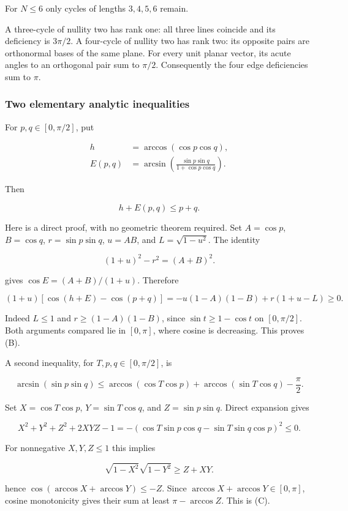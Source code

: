 \documentclass[11pt,a4paper]{article}
\begin{document}
For \(N\le6\) only cycles of lengths \(3,4,5,6\) remain.

A three-cycle of nullity two has rank one: all three lines coincide and its deficiency is \(3\pi/2\). A four-cycle of nullity two has rank two: its opposite pairs are orthonormal bases of the same plane. For every unit planar vector, its acute angles to an orthogonal pair sum to \(\pi/2\). Consequently the four edge deficiencies sum to \(\pi\).

\subsubsection{Two elementary analytic inequalities}\label{two-elementary-analytic-inequalities}

For \(p,q\in[0,\pi/2]\), put

\[
\begin{aligned}h&=\arccos(\cos p\cos q),\\E(p,q)&=\arcsin\!\left(\frac{\sin p\sin q}{1+\cos p\cos q}\right).\end{aligned}
\]

Then

\[
h+E(p,q)\le p+q.\tag{B}
\]

Here is a direct proof, with no geometric theorem required. Set \(A=\cos p\), \(B=\cos q\), \(r=\sin p\sin q\), \(u=AB\), and \(L=\sqrt{1-u^2}\). The identity

\[
(1+u)^2-r^2=(A+B)^2.
\]

gives \(\cos E=(A+B)/(1+u)\). Therefore

\[
(1+u)[\cos(h+E)-\cos(p+q)]=-u(1-A)(1-B)+r(1+u-L)\ge0.
\]

Indeed \(L\le1\) and \(r\ge(1-A)(1-B)\), since \(\sin t\ge1-\cos t\) on \([0,\pi/2]\). Both arguments compared lie in \([0,\pi]\), where cosine is decreasing. This proves (B).

A second inequality, for \(T,p,q\in[0,\pi/2]\), is

\[
\arcsin(\sin p\sin q)\le\arccos(\cos T\cos p)+\arccos(\sin T\cos q)-\frac{\pi}{2}.\tag{C}
\]

Set \(X=\cos T\cos p\), \(Y=\sin T\cos q\), and \(Z=\sin p\sin q\). Direct expansion gives

\[
X^2+Y^2+Z^2+2XYZ-1=-(\cos T\sin p\cos q-\sin T\sin q\cos p)^2\le0.
\]

For nonnegative \(X,Y,Z\le1\) this implies

\[
\sqrt{1-X^2}\sqrt{1-Y^2}\ge Z+XY.
\]

hence \(\cos(\arccos X+\arccos Y)\le-Z\). Since \(\arccos X+\arccos Y\in[0,\pi]\), cosine monotonicity gives their sum at least \(\pi-\arccos Z\). This is (C).
\end{document}
